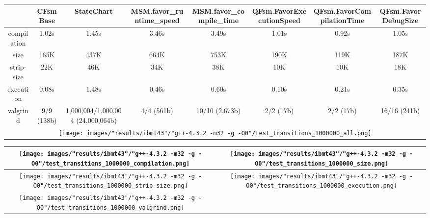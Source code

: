 \begin{landscape}
\begin{table}
\caption{"ibmt43" [df6407d], g++-4.3.2 -m32 -g -O0/test transitions 1000000}
\centering
\begin{longtable}{| c | c |c |c |c |c |c |c |}
\hline
& CFsmBase& StateChart& MSM.favor\_runtime\_speed& MSM.favor\_compile\_time& QFsm.FavorExecutionSpeed& QFsm.FavorCompilationTime& QFsm.FavorDebugSize\\
\hline
compilation & 1.02s & 1.45s & 3.46s & 3.49s & 1.01s & 0.92s & 1.05s\\
\hline
size & 165K & 437K & 664K & 753K & 190K & 119K & 187K\\
\hline
strip-size & 22K & 46K & 34K & 38K & 10K & 10K & 18K\\
\hline
execution & 0.08s & 1.48s & 0.46s & 0.60s & 0.10s & 0.21s & 0.35s\\
\hline
valgrind & 9/9 (138b) & 1,000,004/1,000,004 (24,000,064b) & 4/4 (561b) & 10/10 (2,673b) & 2/2 (17b) & 2/2 (17b) & 16/16 (241b)\\
\hline
\multicolumn{8}{|c|}{\texttt{[image: images/"results/ibmt43"/"g++-4.3.2 -m32 -g -O0"/test\_transitions\_1000000\_all.png]}}\\
\hline
\end{longtable}
\end{table}
\end{landscape}
\newpage
\begin{table}
\centering
\begin{longtable}{| c | c |}
\hline
\texttt{[image: images/"results/ibmt43"/"g++-4.3.2 -m32 -g -O0"/test\_transitions\_1000000\_compilation.png]}& \texttt{[image: images/"results/ibmt43"/"g++-4.3.2 -m32 -g -O0"/test\_transitions\_1000000\_size.png]}\\
\hline
\texttt{[image: images/"results/ibmt43"/"g++-4.3.2 -m32 -g -O0"/test\_transitions\_1000000\_strip-size.png]}& \texttt{[image: images/"results/ibmt43"/"g++-4.3.2 -m32 -g -O0"/test\_transitions\_1000000\_execution.png]}\\
\hline
\texttt{[image: images/"results/ibmt43"/"g++-4.3.2 -m32 -g -O0"/test\_transitions\_1000000\_valgrind.png]}& \\ \hline
\end{longtable}
\end{table}
